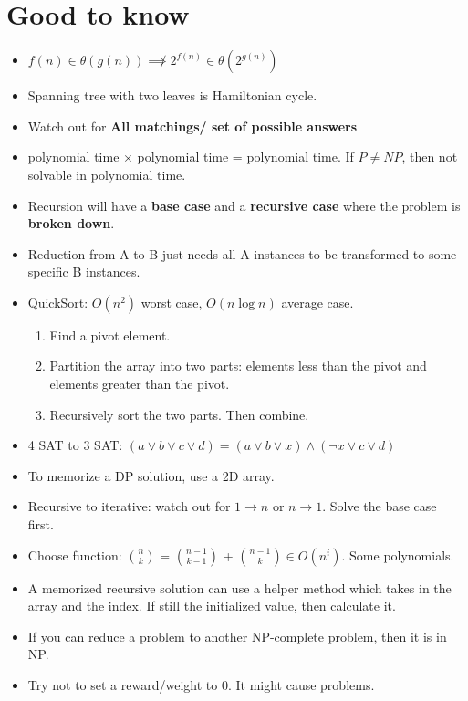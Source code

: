 \documentclass[conference]{IEEEtran}
\begin{document}
\section{Good to know}
\begin{itemize}
    \item $f(n) \in \theta(g(n)) \not \implies 2^{f(n)} \in \theta(2^{g(n)})$ 
    \item Spanning tree with two leaves is Hamiltonian cycle.
    \item Watch out for \textbf{All matchings/ set of possible answers}
    \item polynomial time $\times$ polynomial time = polynomial time. If $P\neq NP$, then not solvable in polynomial time.
    \item Recursion will have a \textbf{base case} and a \textbf{recursive case} where the problem is \textbf{broken down}.
    \item Reduction from A to B just needs all A instances to be transformed to some specific B instances.
    \item QuickSort: $O(n^2)$ worst case, $O(n \log n)$ average case. \begin{enumerate}
        \item Find a pivot element.
        \item Partition the array into two parts: elements less than the pivot and elements greater than the pivot.
        \item Recursively sort the two parts. Then combine.
    \end{enumerate}
    \item 4 SAT to 3 SAT: $(a \lor b \lor c \lor d) = (a \lor b \lor x) \land (\neg x \lor c \lor d)$
    \item To memorize a DP solution, use a 2D array.
    \item Recursive to iterative: watch out for $1\to n$ or $n\to 1$. Solve the base case first.
    \item Choose function: $n \choose k$ = $n-1 \choose k-1$ + $n-1 \choose k$$\in O(n^i)$. Some polynomials. 
    \item A memorized recursive solution can use a helper method which takes in the array and the index. If still the initialized value, then calculate it.
    \item If you can reduce a problem to another NP-complete problem, then it is in NP.
    \item Try not to set a reward/weight to 0. It might cause problems.
\end{itemize}
\end{document}
